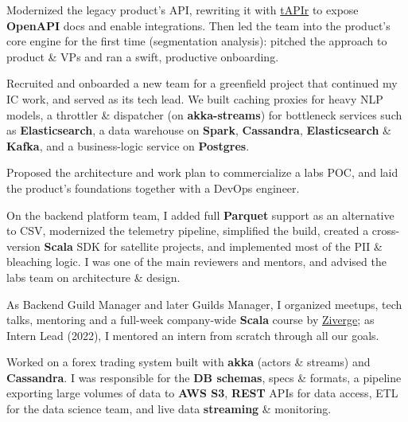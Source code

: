 \documentclass[10pt]{cv}
\newcommand{\kw}[1]{\textbf{#1}}
\begin{document}
\begin{flushleft}
            Modernized the legacy product's API, rewriting it with \href{https://tapir.softwaremill.com}{tAPIr} to expose \kw{OpenAPI} docs and enable
            integrations. Then led the team into the product's core engine for the first time (segmentation analysis): pitched the approach to product
            \& VPs and ran a swift, productive onboarding.

            Recruited and onboarded a new team for a greenfield project that continued my IC work, and served as its tech lead. We built
            caching proxies for heavy NLP models, a throttler \& dispatcher (on \kw{akka-streams}) for bottleneck services such as \kw{Elasticsearch},
            a data warehouse on \kw{Spark}, \kw{Cassandra}, \kw{Elasticsearch} \& \kw{Kafka}, and a business-logic service on \kw{Postgres}.

            Proposed the architecture and work plan to commercialize a labs POC, and laid the product's foundations together with a DevOps engineer.

            On the backend platform team, I added full \kw{Parquet} support as an alternative to CSV, modernized the telemetry pipeline, simplified the build,
            created a cross-version \kw{Scala} SDK for satellite projects, and implemented most of the PII \& bleaching logic.
            I was one of the main reviewers and mentors, and advised the labs team on architecture \& design.

            As Backend Guild Manager and later Guilds Manager, I organized meetups, tech talks, mentoring and a full-week company-wide
            \kw{Scala} course by \href{https://ziverge.com/}{Ziverge}; as Intern Lead (2022), I mentored an intern from scratch through all our goals.


            Worked on a forex trading system built with \kw{akka} (actors \& streams) and \kw{Cassandra}. I was responsible for the \kw{DB schemas},
            specs \& formats, a pipeline exporting large volumes of data to \kw{AWS S3}, \kw{REST} APIs for data access, ETL for the data science team,
            and live data \kw{streaming} \& monitoring.


\end{flushleft}
\end{document}
